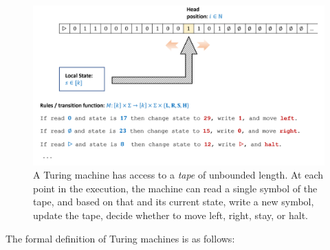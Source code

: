 \begin{figure}
\centering
\includegraphics[width=\textwidth, height=0.25\paperheight, keepaspectratio]{../figure/turingmachine.png}
\caption{A Turing machine has access to a \emph{tape} of unbounded
length. At each point in the execution, the machine can read a single
symbol of the tape, and based on that and its current state, write a new
symbol, update the tape, decide whether to move left, right, stay, or
halt.}
\label{turing-machine-fig}
\end{figure}

The formal definition of Turing machines is as follows:

